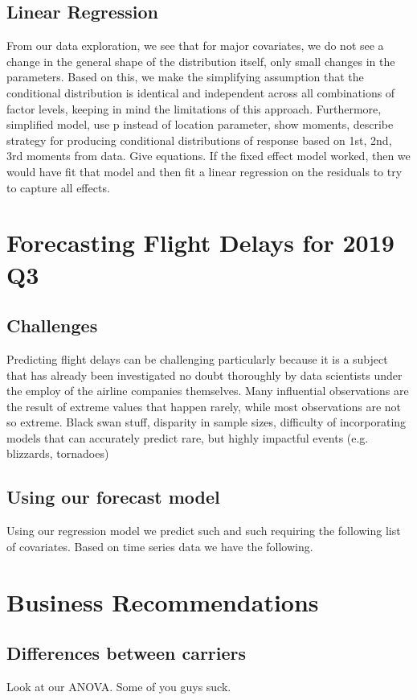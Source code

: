 \documentclass[12pt, a4paper]{book}
\newcommand\tab[1][1cm]{\hspace*{#1}}
\begin{document}
	\section{Linear Regression}
	\tab From our data exploration, we see that for major covariates, we do not see a change in the general shape of the distribution itself, only small changes in the parameters. Based on this, we make the simplifying assumption that the conditional distribution is identical and independent across all combinations of factor levels, keeping in mind the limitations of this approach.  Furthermore, simplified model, use p instead of location parameter, show moments, describe strategy for producing conditional distributions of response based on 1st, 2nd, 3rd moments from data. Give equations. If the fixed effect model worked, then we would have fit that model and then fit a linear regression on the residuals to try to capture all effects. \\
	

\chapter{Forecasting Flight Delays for 2019 Q3}
	\section{Challenges}
	\tab Predicting flight delays can be challenging particularly because it is a subject that has already been investigated no doubt thoroughly by data scientists under the employ of the airline companies themselves. Many influential observations are the result of extreme values that happen rarely, while most observations are not so extreme. Black swan stuff, disparity in sample sizes, difficulty of incorporating models that can accurately predict rare, but highly impactful events (e.g. blizzards, tornadoes)
	\section{Using our forecast model}
	\tab Using our regression  model we predict  such and such requiring the following list of covariates. Based on time series data we have the following.
\chapter{Business Recommendations}
	\section{Differences between carriers}
	\tab Look at our ANOVA. Some of you guys suck.
\end{document}
